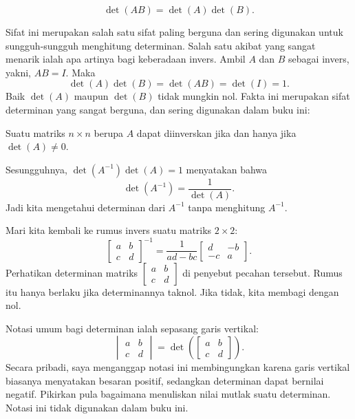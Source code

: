 \begin{theorem}
\begin{equation*}
\det(AB) = \det(A)\det(B) .
\end{equation*}
\end{theorem}

Sifat ini merupakan salah satu sifat paling berguna dan sering digunakan untuk
sungguh-sungguh menghitung determinan. Salah satu akibat yang sangat menarik ialah
apa artinya bagi keberadaan invers.
Ambil $A$ dan $B$ sebagai invers, yakni, $AB=I$. Maka
\begin{equation*}
\det(A)\det(B) = \det(AB) = \det(I) = 1 .
\end{equation*}
Baik $\det(A)$ maupun $\det(B)$ tidak mungkin nol.
Fakta ini merupakan sifat determinan yang sangat berguna, dan
sering digunakan dalam buku ini:

\begin{theorem}
Suatu matriks $n \times n$ berupa $A$ dapat diinverskan jika dan hanya jika $\det (A) \neq 0$.
\end{theorem}

Sesungguhnya, $\det(A^{-1}) \det(A) = 1$ menyatakan bahwa
\begin{equation*}
\det(A^{-1}) =
\frac{1}{\det(A)}.
\end{equation*}
Jadi kita mengetahui determinan dari $A^{-1}$
tanpa menghitung $A^{-1}$.

Mari kita kembali ke rumus invers suatu matriks $2 \times 2$:
\begin{equation*}
\begin{bmatrix}
a & b \\
c & d
\end{bmatrix}^{-1}
=
\frac{1}{ad-bc}
\begin{bmatrix}
d & -b \\
-c & a
\end{bmatrix} .
\end{equation*}
Perhatikan determinan matriks
$[\begin{smallmatrix}a&b\\c&d\end{smallmatrix}]$
di penyebut pecahan tersebut.
Rumus itu hanya berlaku jika determinannya taknol.
Jika tidak, kita membagi dengan nol.

\medskip

Notasi umum bagi determinan ialah sepasang garis
vertikal:
\begin{equation*}
\begin{vmatrix}
a & b \\
c & d
\end{vmatrix}
=
\det \left(
\begin{bmatrix}
a & b \\
c & d
\end{bmatrix}
\right) .
\end{equation*}
Secara pribadi, saya menganggap notasi ini membingungkan karena garis vertikal biasanya
menyatakan besaran positif, sedangkan determinan dapat bernilai negatif. Pikirkan pula
bagaimana menuliskan nilai mutlak suatu determinan.
Notasi ini tidak digunakan dalam buku ini.

